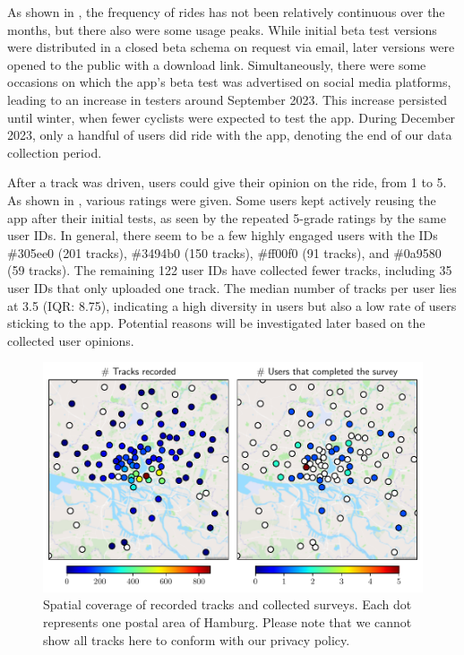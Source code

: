 As shown in , the frequency of rides has not been relatively continuous over the months, but there also were some usage peaks. While initial beta test versions were distributed in a closed beta schema on request via email, later versions were opened to the public with a download link. Simultaneously, there were some occasions on which the app's beta test was advertised on social media platforms, leading to an increase in testers around September 2023. This increase persisted until winter, when fewer cyclists were expected to test the app. During December 2023, only a handful of users did ride with the app, denoting the end of our data collection period. 

After a track was driven, users could give their opinion on the ride, from 1 to 5. As shown in , various ratings were given. Some users kept actively reusing the app after their initial tests, as seen by the repeated 5-grade ratings by the same user IDs. In general, there seem to be a few highly engaged users with the IDs \#305ee0 (201 tracks), \#3494b0 (150 tracks), \#ff00f0 (91 tracks), and \#0a9580 (59 tracks). The remaining 122 user IDs have collected fewer tracks, including 35 user IDs that only uploaded one track. The median number of tracks per user lies at 3.5 (IQR: 8.75), indicating a high diversity in users but also a low rate of users sticking to the app. Potential reasons will be investigated later based on the collected user opinions.

\begin{figure}[t]
\caption{Spatial coverage of recorded tracks and collected surveys. Each dot represents one postal area of Hamburg. Please note that we cannot show all tracks here to conform with our privacy policy.}\label{fig:app-spatial-distribution}
\includegraphics[width=\linewidth]{images/app-spatial-distribution.pdf}
\end{figure}

